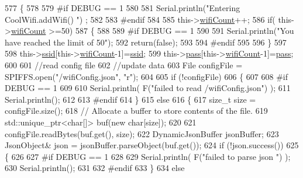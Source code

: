 \begin{DoxyCode}
577 \{
578 
579 \textcolor{preprocessor}{#if DEBUG == 1}
580     
581     Serial.println(\textcolor{stringliteral}{"Entering CoolWifi.addWifi() "}) ;
582 
583 \textcolor{preprocessor}{#endif  }
584     
585     this->\hyperlink{classCoolWifi_ab133bd92fcb895b884deecd6678592e4}{wifiCount}++;
586     \textcolor{keywordflow}{if}( this->\hyperlink{classCoolWifi_ab133bd92fcb895b884deecd6678592e4}{wifiCount} >=50)
587     \{
588     
589 \textcolor{preprocessor}{    #if DEBUG == 1}
590 
591         Serial.println(\textcolor{stringliteral}{"You have reached the limit of 50"});
592         \textcolor{keywordflow}{return}(\textcolor{keyword}{false});  
593     
594 \textcolor{preprocessor}{    #endif}
595 
596     \}
597 
598     this->\hyperlink{classCoolWifi_a893b21d0fed821438733bba2e73fb4c2}{ssid}[this->\hyperlink{classCoolWifi_ab133bd92fcb895b884deecd6678592e4}{wifiCount}-1]=\hyperlink{classCoolWifi_a893b21d0fed821438733bba2e73fb4c2}{ssid};
599     this->\hyperlink{classCoolWifi_a0c3332a149245aaad060b32593a54c9b}{pass}[this->\hyperlink{classCoolWifi_ab133bd92fcb895b884deecd6678592e4}{wifiCount}-1]=\hyperlink{classCoolWifi_a0c3332a149245aaad060b32593a54c9b}{pass};
600     
601     \textcolor{comment}{//read config file}
602     \textcolor{comment}{//update data}
603     File configFile = SPIFFS.open(\textcolor{stringliteral}{"/wifiConfig.json"}, \textcolor{stringliteral}{"r"});
604 
605     \textcolor{keywordflow}{if} (!configFile) 
606     \{
607     
608 \textcolor{preprocessor}{    #if DEBUG == 1 }
609 
610         Serial.println( F(\textcolor{stringliteral}{"failed to read /wifiConfig.json"}) );
611         Serial.println();
612 
613 \textcolor{preprocessor}{    #endif}
614     \}
615     \textcolor{keywordflow}{else}
616     \{
617         \textcolor{keywordtype}{size\_t} size = configFile.size();
618         \textcolor{comment}{// Allocate a buffer to store contents of the file.}
619         std::unique\_ptr<char[]> buf(\textcolor{keyword}{new} \textcolor{keywordtype}{char}[size]);
620 
621         configFile.readBytes(buf.get(), size);
622         DynamicJsonBuffer jsonBuffer;
623         JsonObject& json = jsonBuffer.parseObject(buf.get());
624         \textcolor{keywordflow}{if} (!json.success()) 
625         \{
626         
627 \textcolor{preprocessor}{        #if DEBUG == 1 }
628 
629             Serial.println( F(\textcolor{stringliteral}{"failed to parse json "}) );
630             Serial.println();
631         
632 \textcolor{preprocessor}{        #endif}
633         \} 
634         \textcolor{keywordflow}{else}

\end{DoxyCode}
